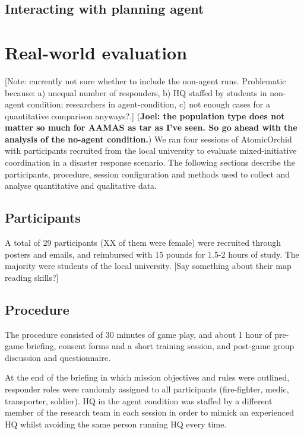 \subsection{Interacting with planning agent}

 





\section{Real-world evaluation}
[Note: currently not sure whether to include the non-agent runs. Problematic because: a) unequal number of responders, b) HQ staffed by students in non-agent condition; researchers in agent-condition, c) not enough cases for a quantitative comparison anyways?.]
(\textbf{Joel: the population type does not matter so much for AAMAS as tar as I've seen. So go ahead with the analysis of the no-agent condition.})
We ran four sessions of AtomicOrchid with participants recruited from the local university to evaluate mixed-initiative coordination in a disaster response scenario. The following sections describe the participants, procedure, session configuration and methods used to collect and analyse quantitative and qualitative data.

\subsection{Participants}
A total of 29 participants (XX of them were female) were recruited through posters and emails, and reimbursed with 15 pounds for 1.5-2 hours of study. The majority were students of the local university. [Say something about their map reading skills?]

\subsection{Procedure}
The procedure consisted of 30 minutes of game play, and about 1 hour of pre-game briefing, consent forms and a short training session, and post-game group discussion and questionnaire. 


At the end of the briefing in which mission objectives and rules were outlined, responder roles were randomly assigned to all participants (fire-fighter, medic, transporter, soldier). HQ in the agent condition was staffed by a different member of the research team in each session in order to mimick an experienced HQ whilst avoiding the same person running HQ every time. 

